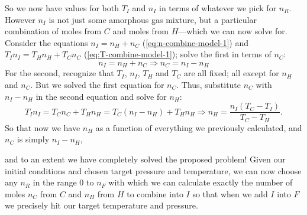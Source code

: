 \documentclass{article}
\begin{document}
So we now have values for both $T_I$ and $n_I$ in terms of whatever we pick for $n_R$.
However $n_I$ is not just some amorphous gas mixture, but a particular combination of moles from
$C$ and moles from $H$---which we can now solve for.
Consider the equations
$n_I=n_H+n_C$ (\cref{eq:n-combine-model-1}) and
$T_I n_I=T_H n_H+T_C n_C$ (\cref{eq:T-combine-model-1});
solve the first in terms of $n_C$:
\[
    n_I=n_H+n_C \Rightarrow n_C=n_I-n_H
\]
For the second, recognize that $T_I$, $n_I$, $T_H$ and $T_C$ are all fixed; all except for $n_H$ and
$n_C$. But we solved the first equation for $n_C$. Thus, substitute $n_C$ with $n_I-n_H$ in the
second equation and solve for $n_H$:
\begin{equation}
    T_I n_I
    = T_C n_C+T_H n_H
    = T_C(n_I-n_H)+T_H n_H
    \Rightarrow
    n_H = \frac{n_I(T_C-T_I)}{T_C-T_H}.
\end{equation}
So that now we have $n_H$ as a function of everything we previously calculated, and $n_C$ is simply
$n_I-n_H$,
\begin{itshape}
    and to an extent we have completely solved the proposed problem! Given our initial conditions
    and chosen target pressure and temperature, we can now choose any $n_R$ in the range $0$ to
    $n_F$ with which we can calculate exactly the number of moles $n_C$ from $C$ and $n_H$ from $H$
    to combine into $I$ so that when we add $I$ into $F$ we precisely hit our target temperature and
    pressure.
\end{itshape}
\end{document}
